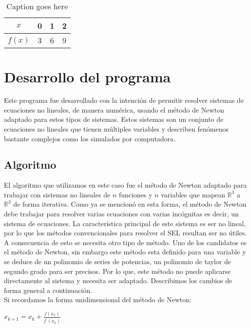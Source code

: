 ﻿\documentclass[11pt]{article}
\begin{document}
\begin{table}[H]
	\centering
		\begin{tabular}{|c|c|c|c|}\hline
		$x$ &0&1&2\\ \hline
		$f(x)$ &3&6&9\\ \hline		
		\end{tabular}
	\caption{Caption goes here}
	\label{tab:data1}
\end{table}


\section{Desarrollo del programa}
Este programa fue desarrollado con la intención de permitir resolver sistemas de ecuaciones no lineales, de manera numérica, usando el método de Newton adaptado para estos tipos de sistemas. Estos sistemas son un conjunto de ecuaciones no lineales que tienen múltiples variables y describen fenómenos bastante complejos como los simulados por computadora.

\subsection{Algoritmo}
El algoritmo que utilizamos en este caso fue el  método de Newton adaptado para trabajar con sistemas no lineales de $n$ funciones y $n$ variables que mapean $\mathbb{R}^3$ a $\mathbb{R}^3$ de forma iterativa. Como ya se mencionó en esta forma, el método de Newton debe trabajar para resolver varias ecuaciones con varias incógnitas es decir, un sistema de ecuaciones. La característica principal de este sistema es ser no lineal, por lo que los métodos convencionales para resolver el SEL resultan ser no útiles. A consecuencia de esto se necesita otro tipo de método. Uno de los candidatos es el método de Newton, sin embargo este método esta definido para una variable y se deduce de un polinomio de series de potencias, un polinomio de taylor de segundo grado para ser precisos. Por lo que, este método no puede aplicarse directamente al sistema y necesita ser adaptado. Describimos los cambios de forma general a continuación.\\

Si recordamos la forma unidimensional del método de Newton:\\
\begin{center}
$x_{k+1} = x_{k} + \frac{f(x_{k})}{f^\prime(x_{k})} \label{eq:1}$\\
\end{center}
\end{document}
